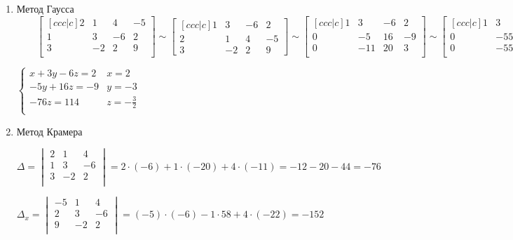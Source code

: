 \documentclass{book}
\theoremstyle{definition}
\begin{document}
         \begin{enumerate}
             \item Метод Гаусса $\qquad \begin{bmatrix} [c c c|c] 2 & 1 & 4 & -5\\ 1 & 3 & -6 & 2\\ 3 & -2 & 2 & 9\\ \end{bmatrix} \sim \begin{bmatrix} [c c c|c] 1 & 3 & -6 & 2 \\ 2 & 1 & 4 & -5\\ 3 & -2 & 2 & 9 \end{bmatrix} \sim \begin{bmatrix} [c c c|c] 1 & 3 & -6 & 2\\ 0 & -5 & 16 & -9\\ 0 & -11 & 20 & 3\\ \end{bmatrix}\sim \begin{bmatrix} [c c c|c] 1 & 3 & -6 & 2\\ 0 & -55 & 176 & -99\\ 0 & -55 & 100&15\\ \end{bmatrix} \sim \begin{bmatrix} [c c c|c] 1 & 3 & -6 & 2\\ 0 & -5 & 16 & -9\\ 0 & 0 & -76 & 114\\ \end{bmatrix}   $ 

                 $\begin{cases}
                     x+3y-6z=2 & x =2\\
                     -5y+16z=-9 & y=-3\\
                     -76z=114 & z=-\frac{3}{2}\\
                 \end{cases}$ 
             \item Метод Крамера

                 $\Delta = \begin{vmatrix} 2 & 1 & 4\\ 1 &3 & -6\\ 3 & -2 & 2\\  \end{vmatrix}  = 2\cdot (-6) + 1\cdot (-20) + 4\cdot (-11)  = -12 -20-44 = -76$

                 $\Delta_x = \begin{vmatrix} -5 & 1 & 4\\ 2 & 3 & -6 \\ 9 & -2 & 2\\  \end{vmatrix} = (-5)\cdot (-6) - 1 \cdot 58 + 4\cdot (-22) = -152 $ 


\end{enumerate}
\end{document}

